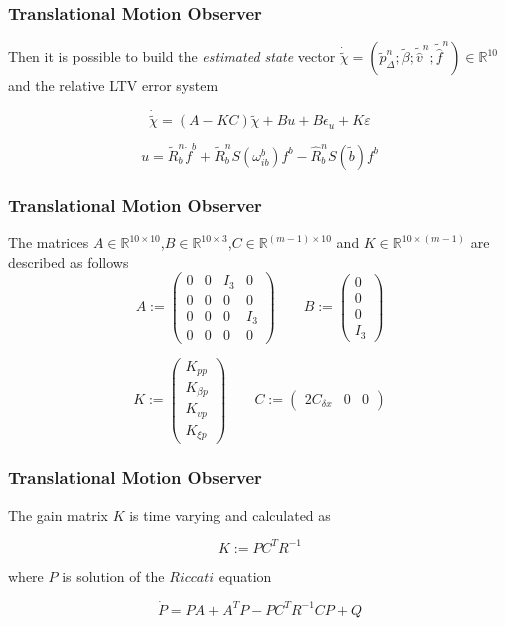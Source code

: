 \documentclass{beamer}
\begin{document}
	\begin{frame}
		\frametitle{Translational Motion Observer}
		Then it is possible to build the \textit{estimated state} vector $\dot{\tilde{\chi}} = (\tilde{p}^n_\Delta;\tilde{\beta}; \tilde{\hat{v}}^n; \tilde{\hat{f}}^n) \in \mathds{R}^{10}$ and the relative LTV error system
		
		\[ \dot{\tilde{\chi}} = (A - KC)\tilde{\chi} + Bu + B\epsilon_u + K\varepsilon\]
		
		\[ u = \tilde{R}^n_b \dot{f}^b + \tilde{R}^n_b S(\omega^b_{ib})f^b - \hat{R}^n_b S(\tilde{b})f^b\]
	\end{frame}

	\begin{frame}
		\frametitle{Translational Motion Observer}
		The matrices $A \in \mathbb{R}^{10\times 10}$,$B \in \mathbb{R}^{10\times 3}$,$C \in \mathds{R}^{(m-1) \times 10} $ and $K \in \mathds{R}^{10 \times (m-1)}$ are described as follows
		$$
		A :=
		\begin{pmatrix}
		0 & 0 & I_3 & 0 \\ 
		0 & 0 & 0 & 0 \\
		0 & 0 & 0 & I_3 \\
		0 & 0 & 0 & 0
		\end{pmatrix}
		\qquad
		B := 
		\begin{pmatrix}
		0 \\ 0 \\ 0 \\ I_3
		\end{pmatrix}
		$$
		
		$$
		K := 
		\begin{pmatrix}
		K_{pp} \\ K_{\beta p} \\ K_{vp} \\ K_{\xi p}
		\end{pmatrix}
		\qquad
		C :=
		\begin{pmatrix}
		2C_{\delta x} & 0 & 0
		\end{pmatrix}
		$$
	\end{frame}

	\begin{frame}
		\frametitle{Translational Motion Observer}
		The gain matrix $K$ is time varying and calculated as
		
		\[ K := PC^TR^{-1} \]
		
		 where $P$ is solution of the $Riccati$ equation
		
		\[ \dot{P} = PA + A^TP - PC^TR^{-1}CP + Q\]
	\end{frame}
\end{document}
